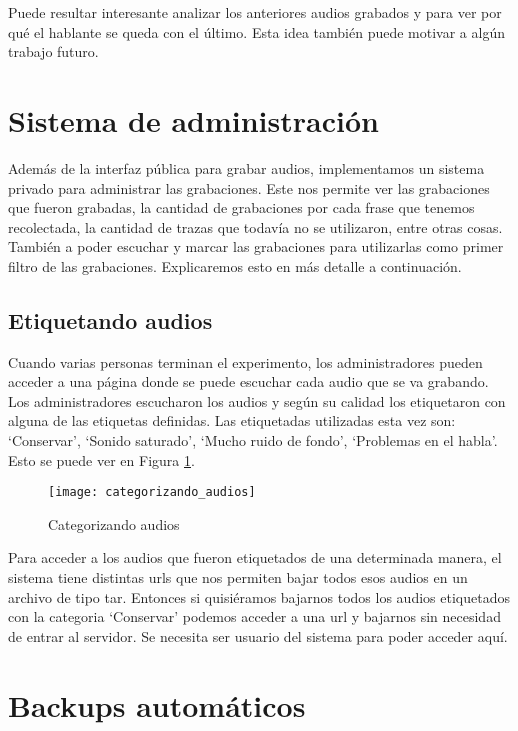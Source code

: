 Puede resultar interesante analizar los anteriores audios grabados y para ver por qué el hablante se queda con el último. Esta idea también puede motivar a algún trabajo futuro.

\section{Sistema de administración}

Además de la interfaz pública para grabar audios, implementamos un sistema privado para administrar las grabaciones. Este nos permite ver las grabaciones que fueron grabadas, la cantidad de grabaciones por cada frase que tenemos recolectada, la cantidad de trazas que todavía no se utilizaron, entre otras cosas. También a poder escuchar y marcar las grabaciones para utilizarlas como primer filtro de las grabaciones. Explicaremos esto en más detalle a continuación.

\subsection{Etiquetando audios}

Cuando varias personas terminan el experimento, los administradores pueden acceder a una página donde se puede escuchar cada audio que se va grabando. Los administradores escucharon los audios y según su calidad los etiquetaron con alguna de las etiquetas definidas. Las etiquetadas utilizadas esta vez son: `Conservar’,  `Sonido saturado’, `Mucho ruido de fondo’, `Problemas en el habla’. Esto se puede ver en Figura \ref{cat}.

\begin{figure}[h!]
    \centerline{\texttt{[image: categorizando\_audios]} }
    \caption{Categorizando audios}
    \label{cat}
\end{figure}

Para acceder a los audios que fueron etiquetados de una determinada manera, el sistema tiene distintas urls que nos permiten bajar todos esos audios en un archivo de tipo tar. Entonces si quisiéramos bajarnos todos los audios etiquetados con la categoria `Conservar’ podemos acceder a una url y bajarnos sin necesidad de entrar al servidor. Se necesita ser usuario del sistema para poder acceder aquí.

\section{Backups automáticos}

